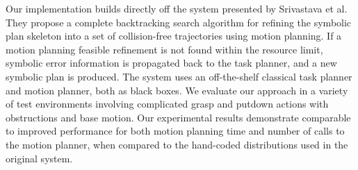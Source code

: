 Our implementation builds directly off the system presented by Srivastava et al.
They propose a complete backtracking search algorithm for refining
the symbolic plan skeleton into a set of collision-free trajectories using motion planning.
If a motion planning feasible refinement is not found within the resource limit,
symbolic error information is propagated back to the task planner, and a new symbolic plan is produced.
The system uses an off-the-shelf classical task planner and motion planner, both as black boxes.
We evaluate our approach in a variety of test environments involving complicated grasp and putdown
actions with obstructions and base motion. Our experimental results demonstrate
comparable to improved performance for both motion planning time and number of calls to
the motion planner, when compared to the hand-coded distributions used in the original system.